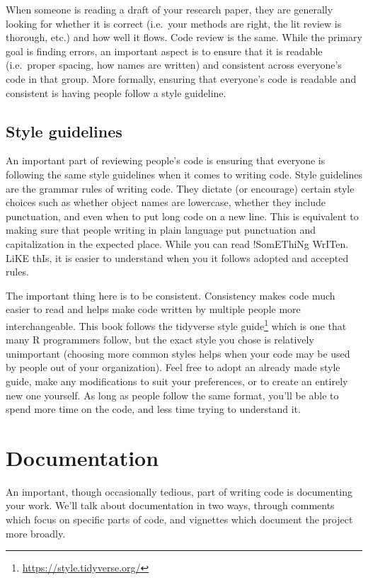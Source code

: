 \documentclass[
]{krantz}
\renewcommand{\href}[2]{#2\footnote{\url{#1}}}
\begin{document}
When someone is reading a draft of your research paper, they are generally looking for whether it is correct (i.e.~your methods are right, the lit review is thorough, etc.) and how well it flows. Code review is the same. While the primary goal is finding errors, an important aspect is to ensure that it is readable (i.e.~proper spacing, how names are written) and consistent across everyone's code in that group. More formally, ensuring that everyone's code is readable and consistent is having people follow a style guideline.

\hypertarget{style-guidelines}{%
\subsection{Style guidelines}\label{style-guidelines}}

An important part of reviewing people's code is ensuring that everyone is following the same style guidelines when it comes to writing code. Style guidelines are the grammar rules of writing code. They dictate (or encourage) certain style choices such as whether object names are lowercase, whether they include punctuation, and even when to put long code on a new line. This is equivalent to making sure that people writing in plain language put punctuation and capitalization in the expected place. While you can read !SomEThiNg WrITen. LiKE thIs, it is easier to understand when you it follows adopted and accepted rules.

The important thing here is to be consistent. Consistency makes code much easier to read and helps make code written by multiple people more interchangeable. This book follows the \href{https://style.tidyverse.org/}{tidyverse style guide} which is one that many R programmers follow, but the exact style you chose is relatively unimportant (choosing more common styles helps when your code may be used by people out of your organization). Feel free to adopt an already made style guide, make any modifications to suit your preferences, or to create an entirely new one yourself. As long as people follow the same format, you'll be able to spend more time on the code, and less time trying to understand it.

\hypertarget{documentation}{%
\section{Documentation}\label{documentation}}

An important, though occasionally tedious, part of writing code is documenting your work. We'll talk about documentation in two ways, through comments which focus on specific parts of code, and vignettes which document the project more broadly.
\end{document}
